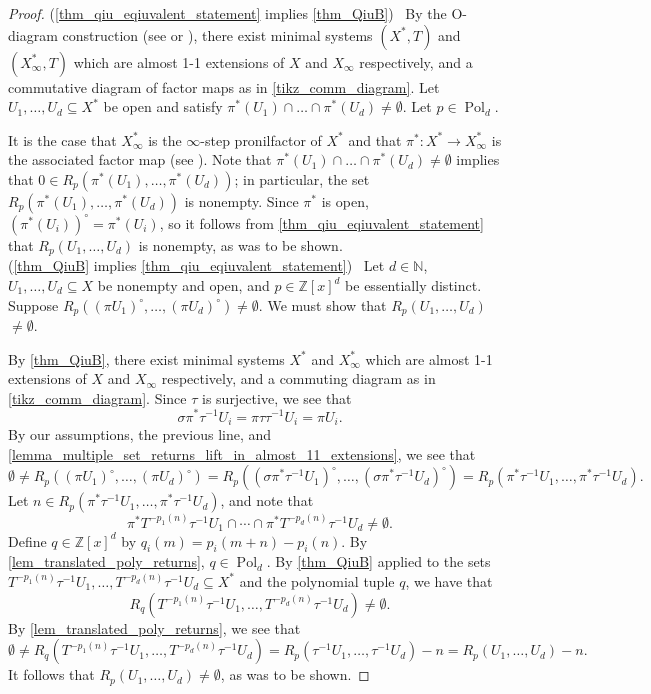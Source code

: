 \documentclass{article}
\theoremstyle{plain}
\theoremstyle{claim}
\theoremstyle{definition}
\theoremstyle{plain}
\theoremstyle{plain}
\newcommand{\N}{\mathbb{N}}
\newcommand{\Z}{\mathbb{Z}}
\newcommand{\Pol}{\operatorname{Pol}}
\newcommand{\1}{\boldsymbol{1}}
\begin{document}
\begin{proof}
    (\cref{thm_qiu_eqiuvalent_statement} implies \cref{thm_QiuB}) \ By the O-diagram construction (see \cite[Theorem~3.1]{Veech-pointDistalFlow} or \cite[Theorem~2.19]{glasner_huang_shao_weiss_ye_2020}), there exist minimal systems $(X^*,T)$ and $(X_{\infty}^*,T)$ which are almost 1-1 extensions of $X$ and $X_{\infty}$ respectively, and a commutative diagram of factor maps as in \eqref{tikz_comm_diagram}.
    Let $U_1, \ldots, U_d \subseteq X^*$ be open and satisfy $\pi^*(U_1)\cap\ldots\cap \pi^*(U_d)\neq \emptyset$.  
    Let $p\in \Pol_d$.

    It is the case that $X^*_\infty$ is the $\infty$-step pronilfactor of $X^*$ and that $\pi^*: X^* \to X^*_\infty$ is the associated factor map (see \cite[Lemma 5.6]{glasner_huang_shao_weiss_ye_2020}).  Note that $\pi^*(U_1)\cap\ldots\cap \pi^*(U_d)\neq \emptyset$ implies that $0 \in R_p(\pi^*(U_1), \ldots, \pi^*(U_d))$; in particular, the set $R_p(\pi^*(U_1), \ldots, \pi^*(U_d))$ is nonempty. Since $\pi^*$ is open, $(\pi^*(U_i))^\circ = \pi^*(U_i)$, so it follows from \cref{thm_qiu_eqiuvalent_statement} that $R_p(U_1, \ldots, U_d)$ is nonempty, as was to be shown.\\

    (\cref{thm_QiuB} implies \cref{thm_qiu_eqiuvalent_statement}) \ Let $d \in \N$, $U_1, \ldots, U_d \subseteq X$ be nonempty and open, and $p \in \Z[x]^d$ be essentially distinct.  Suppose $R_p((\pi U_1)^\circ, \ldots, (\pi U_d)^\circ) \neq \emptyset$.  We must show that $R_p(U_1, \ldots, U_d)$ $\neq \emptyset$.

    By \cref{thm_QiuB}, there exist minimal systems $X^*$ and $X_{\infty}^*$ which are almost 1-1 extensions of $X$ and $X_{\infty}$ respectively, and a commuting diagram as in \eqref{tikz_comm_diagram}. Since $\tau$ is surjective, we see that
    \[\sigma \pi^* \tau^{-1} U_i = \pi \tau \tau^{-1} U_i = \pi U_i.\]
    By our assumptions, the previous line, and \cref{lemma_multiple_set_returns_lift_in_almost_11_extensions}, we see that
    \[\emptyset \neq R_p((\pi U_1)^\circ, \ldots, (\pi U_d)^\circ) = R_p((\sigma \pi^* \tau^{-1} U_1)^\circ, \ldots, (\sigma \pi^* \tau^{-1} U_d)^\circ) = R_p(\pi^* \tau^{-1} U_1, \ldots, \pi^* \tau^{-1} U_d).\]
    Let $n \in R_p(\pi^* \tau^{-1}U_1, \ldots, \pi^* \tau^{-1}U_d)$, and note that
    \[\pi^* T^{-p_1(n)} \tau^{-1}U_1 \cap \cdots \cap \pi^* T^{-p_d(n)} \tau^{-1}U_d \neq \emptyset.\]
    Define $q \in \Z[x]^d$ by $q_i(m) = p_i(m+n) - p_i(n)$.  
    By \cref{lem_translated_poly_returns}, $q\in \Pol_d$.
    By \cref{thm_QiuB} applied to the sets $T^{-p_1(n)}\tau^{-1} U_1, \ldots, T^{-p_d(n)}\tau^{-1} U_d \subseteq X^*$ and the polynomial tuple $q$, we have that
    \[R_q(T^{-p_1(n)}\tau^{-1} U_1, \ldots, T^{-p_d(n)}\tau^{-1} U_d) \neq \emptyset.\]
    By \cref{lem_translated_poly_returns}, we see that
    \[\emptyset \neq R_q(T^{-p_1(n)}\tau^{-1} U_1, \ldots, T^{-p_d(n)}\tau^{-1} U_d) = R_p(\tau^{-1} U_1, \ldots, \tau^{-1} U_d) - n = R_p(U_1, \ldots, U_d) - n.\]
    It follows that $R_p(U_1, \ldots, U_d) \neq \emptyset$, as was to be shown.
\end{proof}
\end{document}
